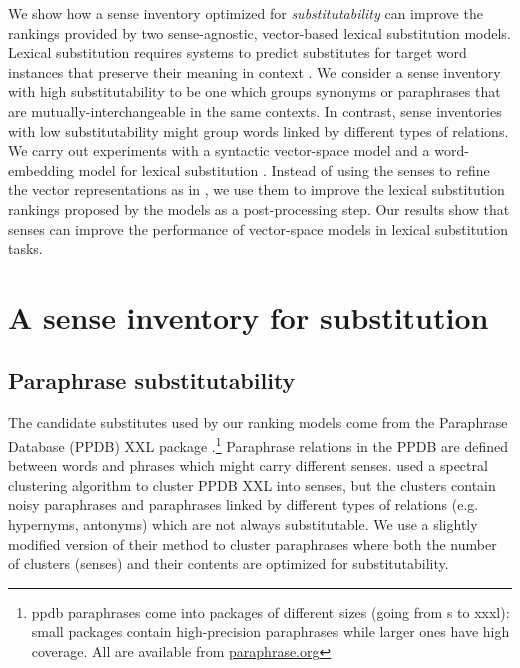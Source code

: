 \documentclass[11pt]{article}
\begin{document}
We show how a sense inventory optimized for \textit{substitutability} can improve the rankings provided by two sense-agnostic, vector-based lexical substitution models. 
Lexical substitution requires systems to predict substitutes for target word instances that preserve their meaning in context \cite{mccarthy-navigli:07}. We consider a sense inventory with high substitutability to be one which groups synonyms or paraphrases that are mutually-interchangeable in the same contexts. In contrast, sense inventories with low substitutability might group words linked by different types of relations. 
We carry out experiments with a syntactic vector-space model \cite{thater-furstenau-pinkal:2011:IJCNLP-2011,apidianaki:2016:EMNLP2016} and a word-embedding model for lexical substitution \cite{melamud-levy-dagan:2015:VSM-NLP}. Instead of using the senses to refine the vector representations as in \cite{faruqui-EtAl:2015:NAACL-HLT}, we use them to improve the lexical substitution rankings proposed by the models as a post-processing step. Our results show that senses can improve the performance of vector-space models in lexical substitution tasks.


\section{A sense inventory for substitution}

\subsection{Paraphrase substitutability}

The candidate substitutes used by our ranking models come from the Paraphrase Database (PPDB) XXL package \cite{ganitkevitch-EtAl:2013:NAACL}.\footnote{{\sc ppdb} paraphrases come into packages of different sizes (going from {\sc s} to {\sc xxxl}): small packages contain high-precision paraphrases while larger ones have high coverage. All are available from \url{paraphrase.org}} Paraphrase relations in the PPDB are defined between words and phrases which might carry different senses.  used a spectral clustering algorithm to cluster PPDB XXL into senses, but 
the clusters contain noisy paraphrases and paraphrases linked by different types of relations (e.g. hypernyms, antonyms) which are not always substitutable. We use a slightly modified version of their method to cluster paraphrases where both the number of clusters (senses) and their contents are optimized for substitutability. 
\end{document}
